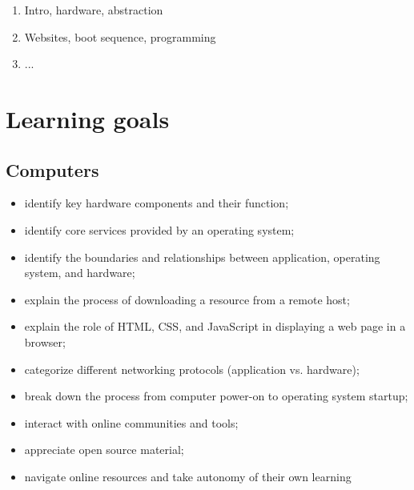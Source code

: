 \documentclass[11pt]{article}
\begin{document}
\begin{enumerate}
    \setcounter{enumi}{0}
  \item Intro, hardware, abstraction
  \item Websites, boot sequence, programming
  \item ...
\end{enumerate}

\section*{Learning goals}

\subsection*{Computers}

\begin{itemize}
  \item identify key hardware components and their function;
  \item identify core services provided by an operating system;
  \item identify the boundaries and relationships between application,
    operating system, and hardware;
  \item explain the process of downloading a resource from a remote host;
  \item explain the role of HTML, CSS, and JavaScript in displaying a web page
    in a browser;
  \item categorize different networking protocols (application vs. hardware);
  \item break down the process from computer power-on to operating system
    startup;
  \item interact with online communities and tools;
  \item appreciate open source material;
  \item navigate online resources and take autonomy of their own learning
\end{itemize}
\end{document}

